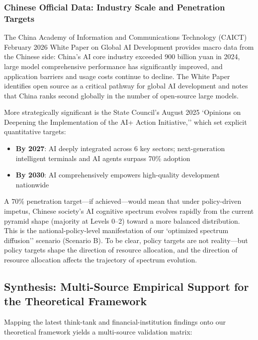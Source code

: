 ﻿\documentclass[12pt,a4paper]{article}
\begin{document}
\subsubsection{Chinese Official Data: Industry Scale and Penetration Targets}

The China Academy of Information and Communications Technology (CAICT) February 2026 White Paper on Global AI Development provides macro data from the Chinese side: China's AI core industry exceeded 900 billion yuan in 2024, large model comprehensive performance has significantly improved, and application barriers and usage costs continue to decline. The White Paper identifies open source as a critical pathway for global AI development and notes that China ranks second globally in the number of open-source large models.

More strategically significant is the State Council's August 2025 `Opinions on Deepening the Implementation of the AI+ Action Initiative,'' which set explicit quantitative targets:
\begin{itemize}
\item \textbf{By 2027}: AI deeply integrated across 6 key sectors; next-generation intelligent terminals and AI agents surpass 70\% adoption
\item \textbf{By 2030}: AI comprehensively empowers high-quality development nationwide
\end{itemize}

A 70\% penetration target---if achieved---would mean that under policy-driven impetus, Chinese society's AI cognitive spectrum evolves rapidly from the current pyramid shape (majority at Levels 0--2) toward a more balanced distribution. This is the national-policy-level manifestation of our `optimized spectrum diffusion'' scenario (Scenario B). To be clear, policy targets are not reality---but policy targets shape the direction of resource allocation, and the direction of resource allocation affects the trajectory of spectrum evolution.

\subsection{Synthesis: Multi-Source Empirical Support for the Theoretical Framework}

Mapping the latest think-tank and financial-institution findings onto our theoretical framework yields a multi-source validation matrix:
\end{document}
